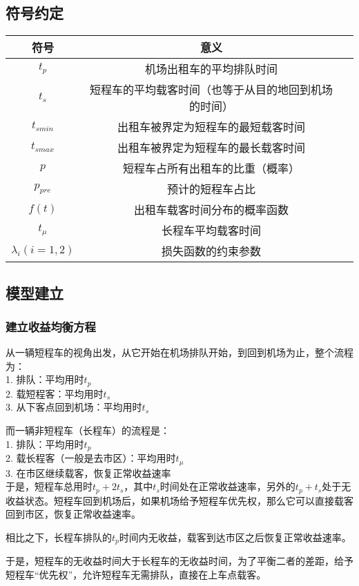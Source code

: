 \documentclass[UTF8]{ctexart}
\begin{document}
	\subsection{符号约定}
	\begin{tabular}{ccc}
		\hline
		符号 & 意义 \\
		\hline
	    $t_p$ & 机场出租车的平均排队时间 \\
	    $t_s$ & 短程车的平均载客时间（也等于从目的地回到机场的时间） \\
	    $t_{smin}$ & 出租车被界定为短程车的最短载客时间 \\
	    $t_{smax}$ & 出租车被界定为短程车的最长载客时间 \\
	    $p$ & 短程车占所有出租车的比重（概率） \\
		$p_{pre}$ & 预计的短程车占比 \\
		 $f(t)$ & 出租车载客时间分布的概率函数 \\
		$t_\mu$ & 长程车平均载客时间 \\
		$\lambda_i (i = 1,2)$  & 损失函数的约束参数 \\
		\hline
	\end{tabular}
	\subsection{模型建立}
	\subsubsection{建立收益均衡方程}
	从一辆短程车的视角出发，从它开始在机场排队开始，到回到机场为止，整个流程为：\\
		1. 排队：平均用时$t_p$ \\
		2. 载短程客：平均用时$t_s$ \\
		3. 从下客点回到机场：平均用时$t_s$
		
	而一辆非短程车（长程车）的流程是：\\
		1. 排队：平均用时$t_p$ \\
		2. 载长程客（一般是去市区）：平均用时$t_\mu$ \\
		3. 在市区继续载客，恢复正常收益速率 \\
	
	于是，短程车总用时$t_p + 2t_s$，其中$t_s$时间处在正常收益速率，另外的$t_p + t_s$处于无收益状态。短程车回到机场后，如果机场给予短程车优先权，那么它可以直接载客回到市区，恢复正常收益速率。
	
	相比之下，长程车排队的$t_p$时间内无收益，载客到达市区之后恢复正常收益速率。
	
	于是，短程车的无收益时间大于长程车的无收益时间，为了平衡二者的差距，给予短程车“优先权”，允许短程车无需排队，直接在上车点载客。
	
\end{document}

